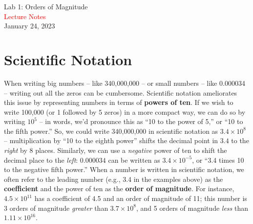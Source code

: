 \documentclass[11pt]{article}
\begin{document}
\begin{center}
\huge{Lab 1: Orders of Magnitude}\\ \medskip \Large{\textcolor{red}{Lecture Notes}} \\ \Large{January 24, 2023}
\end{center}

\section{Scientific Notation}
When writing big numbers -- like 340,000,000 -- or small numbers -- like 0.000034 -- writing out all the zeros can be cumbersome. Scientific notation ameliorates this issue by representing numbers in terms of \textbf{powers of ten}. If we wish to write 100,000 (or 1 followed by 5 zeros) in a more compact way, we can do so by writing $10^5$ -- in words, we'd pronounce this as ``10 to the power of 5,'' or ``10 to the fifth power.'' So, we could write 340,000,000 in scientific notation as $3.4 \times 10^8$ -- multiplication by ``10 to the eighth power'' shifts the decimal point in $3.4$ to the \emph{right} by 8 places. Similarly, we can use a \emph{negative} power of ten to shift the decimal place to the \emph{left}: $0.000034$ can be written as $3.4 \times 10^{-5}$, or ``3.4 times 10 to the negative fifth power.'' When a number is written in scientific notation, we often refer to the leading number (e.g., 3.4 in the examples above) as the \textbf{coefficient} and the power of ten as the \textbf{order of magnitude}. For instance, $4.5 \times 10^{11}$ has a coefficient of 4.5 and an order of magnitude of 11; this number is 3 orders of magnitude \emph{greater} than $3.7 \times 10^8$, and 5 orders of magnitude \emph{less} than $1.11 \times 10^{16}$.

\bigskip
\end{document}
